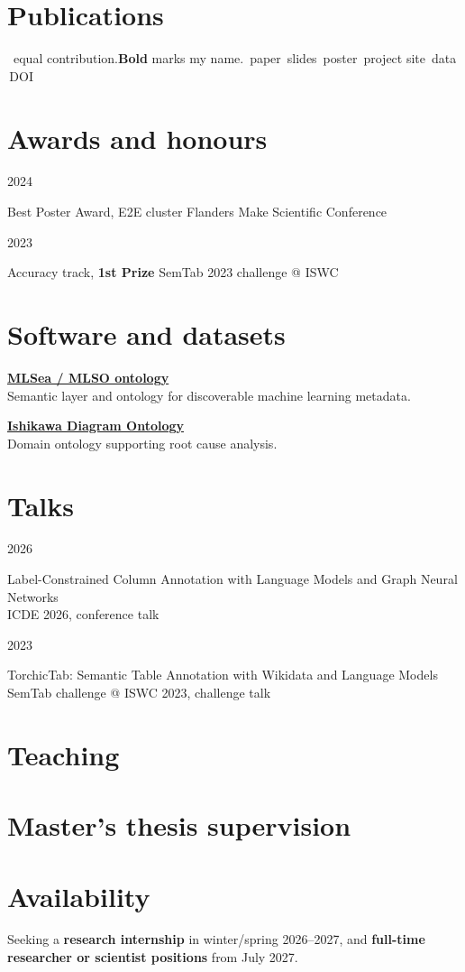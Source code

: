 \documentclass[11pt,a4paper]{article}
\newcommand{\cvdot}{\,\textperiodcentered\,}
\newlength{\raillen}\setlength{\raillen}{30mm}
\newcommand{\cvrow}[2]{%
  \noindent\parbox[t]{\raillen}{\small #1}%
  \parbox[t]{\dimexpr\linewidth-\raillen\relax}{#2}\par\vspace{3pt}}
\newcommand{\cvrowsub}[3]{%
  \noindent\parbox[t]{\raillen}{\small #1}%
  \parbox[t]{\dimexpr\linewidth-\raillen\relax}{#2\\[1pt]{\small #3}}\par\vspace{5pt}}
\begin{document}
\section*{Publications}
{\small \textdagger\ equal contribution.\quad \textbf{Bold} marks my name.\quad
\faFilePdf\,paper \quad \faFilePowerpoint\,slides \quad \faImage\,poster \quad \faGlobe\,project site \quad \faDatabase\,data \quad \aiDoi\,DOI}
\vspace{2pt}
\nocite{*}
\printbibliography[keyword=conference, heading=subbibliography, title={Peer-reviewed conference papers}]
\printbibliography[keyword=workshop,   heading=subbibliography, title={Workshop and challenge papers}]
\printbibliography[keyword=demo,       heading=subbibliography, title={Demonstrations and posters}]

\section*{Awards and honours}
\cvrow{2024}{Best Poster Award, E2E cluster\cvdot{}Flanders Make Scientific Conference}
\cvrow{2023}{Accuracy track, \textbf{1st Prize}\cvdot{}SemTab 2023 challenge @ ISWC \href{https://sem-tab-challenge.github.io/2023/}{\faLink}}

\section*{Software and datasets}
\cvrowsub{}{\href{https://dtai-kg.github.io/MLSO/}{\textbf{MLSea / MLSO ontology}}}
  {Semantic layer and ontology for discoverable machine learning metadata.}
\cvrowsub{}{\href{https://rexpek.github.io/ishikawa-diagram-ontology/ishikawa-diagram-ontology/latest/index.html}{\textbf{Ishikawa Diagram Ontology}}}
  {Domain ontology supporting root cause analysis.}

\section*{Talks}
\cvrowsub{2026}{Label-Constrained Column Annotation with Language Models and Graph Neural Networks}
  {ICDE 2026, conference talk \cvdot{} \href{https://docs.google.com/presentation/d/1y3FvEmdQ3s1inufP0be86mznur9UYWVu/preview}{\faFilePowerpoint}}
\cvrowsub{2023}{TorchicTab: Semantic Table Annotation with Wikidata and Language Models}
  {SemTab challenge @ ISWC 2023, challenge talk \cvdot{} \href{https://docs.google.com/presentation/d/1A7MwTxjogUsiJzF5Qi6_Me5PJjj2fNy2/preview}{\faFilePowerpoint}}

\section*{Teaching}

\CourseRows

\section*{Master's thesis supervision}
\ThesisRows

\section*{Availability}
Seeking a \textbf{research internship} in winter/spring 2026--2027, and
\textbf{full-time researcher or scientist positions} from July 2027.
\end{document}
